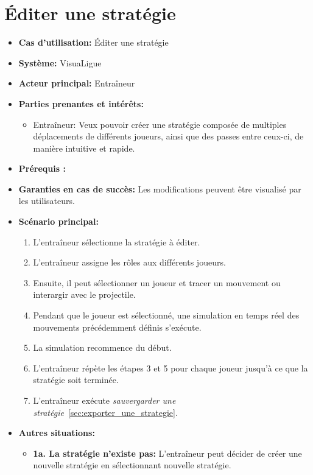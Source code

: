 \section{\'Editer une stratégie}
\label{sec:ajouter_une_strategie}
\begin{itemize}
    \item \textbf{Cas d'utilisation:} \'Editer une strat\'egie
    \item \textbf{Syst\`eme:} VisuaLigue
    \item \textbf{Acteur principal:} Entra\^ineur
    \item \textbf{Parties prenantes et int\'er\^ets:}
        \begin{itemize}
            \item Entraîneur: Veux pouvoir créer une stratégie composée de multiples déplacements de différents joueurs, ainsi que des passes entre ceux-ci, de manière intuitive et rapide.
        \end{itemize}
    \item \textbf{Prérequis :}
    \item \textbf{Garanties en cas de succ\`es:} Les modifications peuvent être visualisé par les utilisateurs.
    \item \textbf{Sc\'enario principal:}
        \begin{enumerate}
            \item L'entraîneur sélectionne la stratégie à éditer.
            \item L'entraîneur assigne les r\^oles aux diff\'erents joueurs.
            \item Ensuite, il peut s\'electionner un joueur et tracer un mouvement ou interargir avec le projectile.
            \item Pendant que le joueur est s\'electionn\'e, une simulation en temps r\'eel des mouvements pr\'ec\'edemment d\'efinis s'ex\'ecute.
            \item La simulation recommence du d\'ebut.
            \item L'entraîneur répète les étapes 3 et 5 pour chaque joueur jusqu'à ce que la stratégie soit terminée.
            \item L'entraîneur exécute \textit{sauvergarder une stratégie}~\ref{sec:exporter_une_strategie}.
    \end{enumerate}
    \item \textbf{Autres situations:}
        \begin{itemize}
            \item \textbf{1a. La stratégie n'existe pas:} L'entraîneur peut décider de créer une nouvelle stratégie en sélectionnant nouvelle stratégie.

\end{itemize}
\end{itemize}

